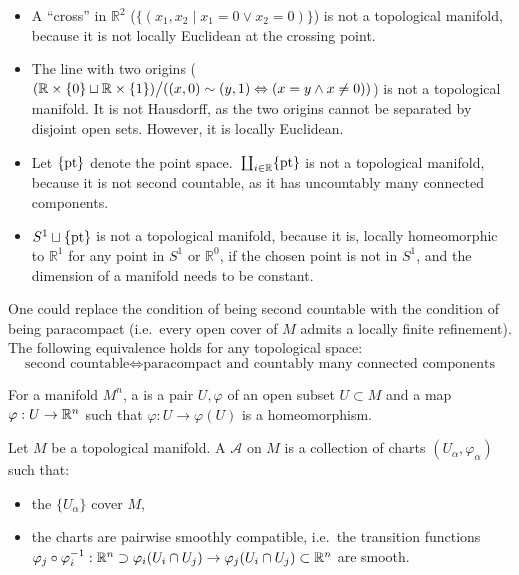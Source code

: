 \documentclass[a4paper,11pt]{article}
\begin{document}
\begin{nonexs}
    \begin{itemize}
        \item A \enquote{cross} in \(\mathbb{R}^2\) (\(\{(x_1,x_2\mid x_1=0 \lor x_2=0)\}\)) is not a topological manifold, because it is not locally Euclidean at the crossing point. 
        \item The line with two origins (\((\mathbb{R}\times\{0\}\sqcup\mathbb{R}\times\{1\})\big/((x,0)\sim(y,1)\Leftrightarrow (x=y \land x\neq 0))\)) is not a topological manifold. It is not Hausdorff, as the two origins cannot be separated by disjoint open sets. However, it is locally Euclidean.
        \item Let \(\{\mathrm{pt}\}\) denote the point space.\ \(\coprod_{i\in \mathbb{R}}\{\mathrm{pt}\}\) is not a topological manifold, because it is not second countable, as it has uncountably many connected components.
        \item \(S^1\sqcup\{\mathrm{pt}\}\) is not a topological manifold, because it is, locally homeomorphic to \(\mathbb{R}^1\) for any point in \(S^1\) or \(\mathbb{R}^0\), if the chosen point is not in \(S^1\), and the dimension of a manifold needs to be constant.
    \end{itemize}
\end{nonexs}

\begin{remark}
    One could replace the condition of being second countable with the condition of being paracompact (i.e.\ every open cover of \(M\) admits a locally finite refinement). The following equivalence holds for any topological space:
    \[\text{second countable}\iff \text{paracompact and countably many connected components}\]
\end{remark}


\begin{definition}[Chart]
    For a manifold \(M^n\), a  is a pair \(U,\varphi\) of an open subset \(U\subset M\) and a map \(\varphi:U\to\mathbb{R}^n\) such that \(\varphi:U\to\varphi(U)\) is a homeomorphism.
\end{definition}

\begin{definition}
    Let \(M\) be a topological manifold. A  \(\mathcal{A}\) on \(M\) is a collection of charts \((U_\alpha,\varphi_\alpha)\) such that:
    \begin{itemize}
        \item the \(\{U_\alpha\}\) cover \(M\),
        \item the charts are pairwise smoothly compatible, i.e.\ the transition functions 
        \(\varphi_j \circ \varphi_i^{-1}:\mathbb{R}^n\supset\varphi_i(U_i\cap U_j)\to\varphi_j(U_i\cap U_j)\subset\mathbb{R}^n\) are smooth.
    \end{itemize}
\end{definition}
\end{document}

